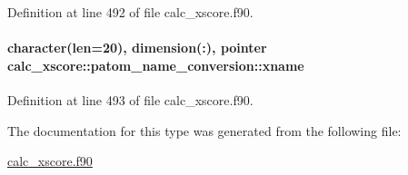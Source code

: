 Definition at line 492 of file calc\-\_\-xscore.\-f90.

\hypertarget{structcalc__xscore_1_1patom__name__conversion_a801f7bda5dea6c76c2892277f7a1385a}{
\paragraph[{xname}]{\setlength{\rightskip}{0pt plus 5cm}character(len=20), dimension(\-:), pointer calc\-\_\-xscore\-::patom\-\_\-name\-\_\-conversion\-::xname}}\label{structcalc__xscore_1_1patom__name__conversion_a801f7bda5dea6c76c2892277f7a1385a}


Definition at line 493 of file calc\-\_\-xscore.\-f90.



The documentation for this type was generated from the following file\-:\begin{DoxyCompactItemize}
\item 
\hyperlink{calc__xscore_8f90}{calc\-\_\-xscore.\-f90}\end{DoxyCompactItemize}
